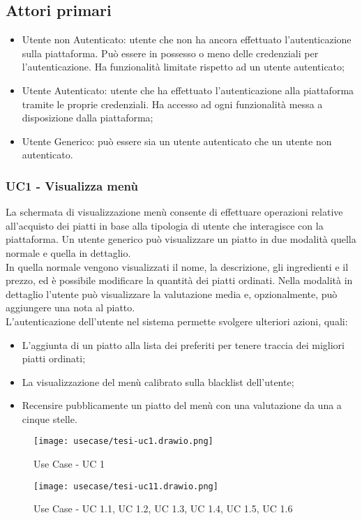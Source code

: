 \subsection{Attori primari}
\begin{itemize}
    \item Utente non Autenticato: utente che non ha ancora effettuato l'autenticazione sulla piattaforma. Può essere in possesso o meno delle credenziali per l'autenticazione. Ha funzionalità limitate rispetto ad un utente autenticato;
    \item Utente Autenticato: utente che ha effettuato l'autenticazione alla piattaforma tramite le proprie credenziali. Ha accesso ad ogni funzionalità messa a disposizione dalla piattaforma;
    \item  Utente Generico: può essere sia un utente autenticato che un utente non autenticato.
\end{itemize}
\subsubsection{UC1 - Visualizza menù}
La schermata di visualizzazione menù consente di effettuare operazioni relative all'acquisto dei piatti in base alla tipologia di utente che interagisce con la piattaforma.
Un utente generico può visualizzare un piatto in due modalità quella normale e quella in dettaglio.\\
In quella normale vengono visualizzati il nome, la descrizione, gli ingredienti e il prezzo, ed è possibile modificare la quantità dei piatti ordinati.
Nella modalità in dettaglio l'utente può visualizzare la valutazione media e, opzionalmente, può aggiungere una nota al piatto.\\
L'autenticazione dell'utente nel sistema permette svolgere ulteriori azioni, quali:\\
\begin{itemize}
    \item L'aggiunta di un piatto alla lista dei preferiti per tenere traccia dei migliori piatti ordinati;
    \item La visualizzazione del menù calibrato sulla blacklist dell'utente;
    \item Recensire pubblicamente un piatto del menù con una valutazione da una a cinque stelle.
\end{itemize}
\begin{figure}[H]
    \centering
    \texttt{[image: usecase/tesi-uc1.drawio.png]}
    \caption{Use Case - UC 1}
\end{figure}
\begin{figure}[H]
    \centering
    \texttt{[image: usecase/tesi-uc11.drawio.png]}
    \caption{Use Case - UC 1.1, UC 1.2, UC 1.3, UC 1.4, UC 1.5, UC 1.6}
\end{figure}
